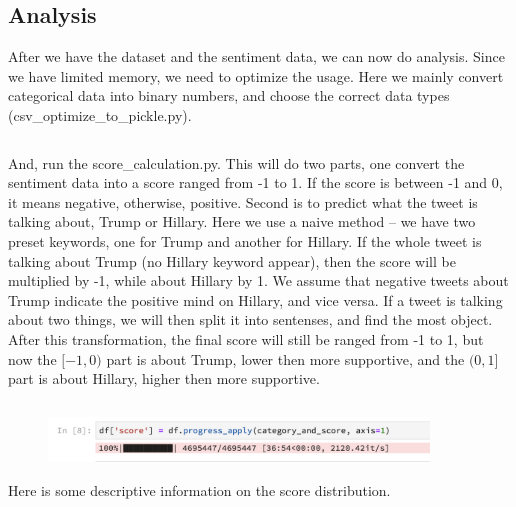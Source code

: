 \documentclass[12pt,a4paper]{report}
\begin{document}
    \subsection{Analysis}
      After we have the dataset and the sentiment data, we can now do analysis. Since we have limited memory, we need to optimize the usage. Here we mainly convert categorical data into binary numbers, and choose the correct data types (csv\_optimize\_to\_pickle.py).

      \inputminted[mathescape, linenos, numbersep=5pt, frame=lines, framesep=2mm, breaklines]{python}{"../csv_optimize_to_pickle.py"}

      And, run the score\_calculation.py. This will do two parts, one convert the sentiment data into a score ranged from -1 to 1. If the score is between -1 and 0, it means negative, otherwise, positive. Second is to predict what the tweet is talking about, Trump or Hillary. Here we use a naive method -- we have two preset keywords, one for Trump and another for Hillary. If the whole tweet is talking about Trump (no Hillary keyword appear), then the score will be multiplied by -1, while about Hillary by 1. We assume that negative tweets about Trump indicate the positive mind on Hillary, and vice versa. If a tweet is talking about two things, we will then split it into sentenses, and find the most object. After this transformation, the final score will still be ranged from -1 to 1, but now the $[-1, 0)$ part is about Trump, lower then more supportive, and the $(0, 1]$ part is about Hillary, higher then more supportive.

      \inputminted[mathescape, linenos, numbersep=5pt, frame=lines, framesep=2mm, breaklines]{python}{"../score_calculation.py"}

      \begin{figure}[H]
        \includegraphics[width=0.9\textwidth]{running.png}
        \centering
      \end{figure}

      Here is some descriptive information on the score distribution.
\end{document}
